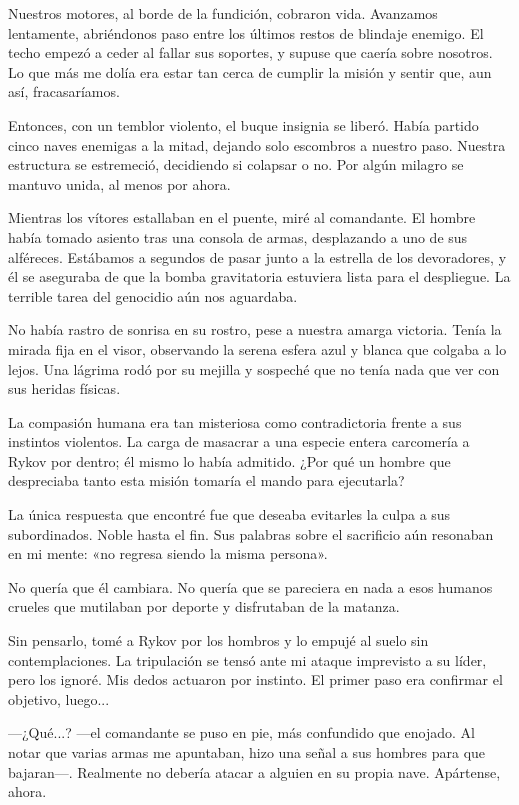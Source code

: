 Nuestros motores, al borde de la fundición, cobraron vida. Avanzamos lentamente, abriéndonos paso entre los últimos restos de blindaje enemigo. El techo empezó a ceder al fallar sus soportes, y supuse que caería sobre nosotros. Lo que más me dolía era estar tan cerca de cumplir la misión y sentir que, aun así, fracasaríamos.

Entonces, con un temblor violento, el buque insignia se liberó. Había partido cinco naves enemigas a la mitad, dejando solo escombros a nuestro paso. Nuestra estructura se estremeció, decidiendo si colapsar o no. Por algún milagro se mantuvo unida, al menos por ahora.

Mientras los vítores estallaban en el puente, miré al comandante. El hombre había tomado asiento tras una consola de armas, desplazando a uno de sus alféreces. Estábamos a segundos de pasar junto a la estrella de los devoradores, y él se aseguraba de que la bomba gravitatoria estuviera lista para el despliegue. La terrible tarea del genocidio aún nos aguardaba.

No había rastro de sonrisa en su rostro, pese a nuestra amarga victoria. Tenía la mirada fija en el visor, observando la serena esfera azul y blanca que colgaba a lo lejos. Una lágrima rodó por su mejilla y sospeché que no tenía nada que ver con sus heridas físicas.

La compasión humana era tan misteriosa como contradictoria frente a sus instintos violentos. La carga de masacrar a una especie entera carcomería a Rykov por dentro; él mismo lo había admitido. ¿Por qué un hombre que despreciaba tanto esta misión tomaría el mando para ejecutarla?

La única respuesta que encontré fue que deseaba evitarles la culpa a sus subordinados. Noble hasta el fin. Sus palabras sobre el sacrificio aún resonaban en mi mente: «no regresa siendo la misma persona».

No quería que él cambiara. No quería que se pareciera en nada a esos humanos crueles que mutilaban por deporte y disfrutaban de la matanza.

Sin pensarlo, tomé a Rykov por los hombros y lo empujé al suelo sin contemplaciones. La tripulación se tensó ante mi ataque imprevisto a su líder, pero los ignoré. Mis dedos actuaron por instinto. El primer paso era confirmar el objetivo, luego...

 —¿Qué...? —el comandante se puso en pie, más confundido que enojado. Al notar que varias armas me apuntaban, hizo una señal a sus hombres para que bajaran—. Realmente no debería atacar a alguien en su propia nave. Apártense, ahora.


